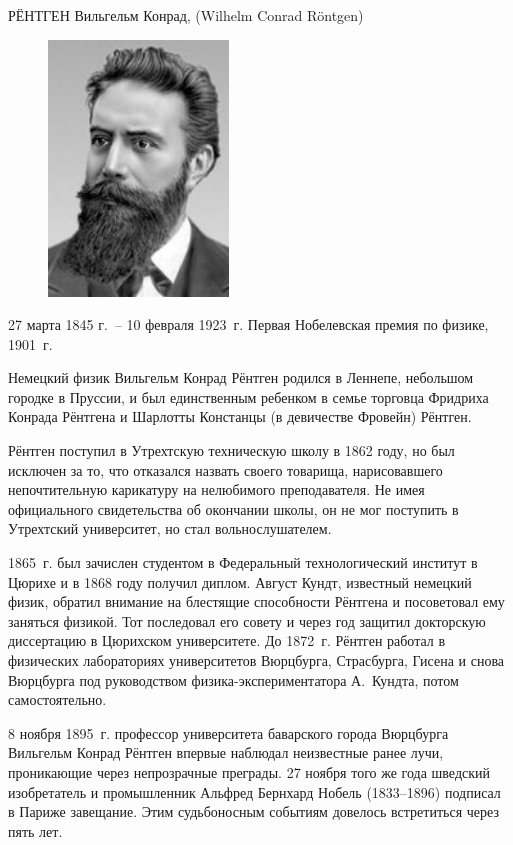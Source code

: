 \documentclass[a4paper,14pt, openany, twoside, draft]{extbook} %
\begin{document}
РЁНТГЕН Вильгельм Конрад, (Wilhelm Conrad Röntgen)

\begin{figure}
\centering
\includegraphics[width=4.794cm,height=6.798cm]{a11-img001.jpg}
\end{figure}
27 марта 1845 г.~-- 10 февраля 1923~г. Первая Нобелевская премия по физике, 1901~г.

Немецкий физик Вильгельм Конрад Рёнтген родился в Леннепе, небольшом городке в Пруссии, и был единственным ребенком в семье торговца Фридриха Конрада Рёнтгена и Шарлотты Констанцы (в девичестве Фровейн) Рёнтген.

Рёнтген поступил в Утрехтскую техническую школу в 1862 году, но был исключен за то, что отказался назвать своего товарища, нарисовавшего непочтительную карикатуру на нелюбимого преподавателя.  Не имея официального свидетельства об окончании школы, он не мог поступить в Утрехтский университет, но стал вольнослушателем.

1865~г. был зачислен студентом в Федеральный технологический институт в Цюрихе и в 1868 году получил диплом.  Август Кундт, известный немецкий физик, обратил внимание на блестящие способности Рёнтгена и посоветовал ему заняться физикой.  Тот последовал его совету и через год защитил докторскую диссертацию в Цюрихском университете.   До 1872~г. Рёнтген работал в физических лабораториях университетов Вюрцбурга, Страсбурга, Гисена и снова Вюрцбурга под руководством физика-экспериментатора А.~Кундта, потом самостоятельно.

8 ноября 1895~г. профессор университета баварского города Вюрцбурга Вильгельм Конрад Рёнтген впервые наблюдал неизвестные ранее лучи, проникающие через непрозрачные преграды.  27 ноября того же года шведский изобретатель и промышленник Альфред Бернхард Нобель (1833–1896) подписал в Париже завещание.  Этим судьбоносным событиям довелось встретиться через пять лет.
\end{document}

